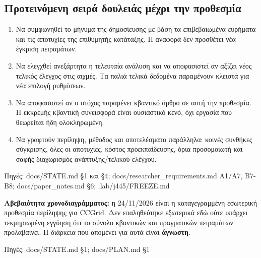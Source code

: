\documentclass[10pt,a4paper]{article}
\newcommand{\src}[1]{\par{\scriptsize\color{gray}Πηγές: {\ttfamily #1}}\par}
\begin{document}
\subsection*{Προτεινόμενη σειρά δουλειάς μέχρι την προθεσμία}
\begin{enumerate}
\item Να συμφωνηθεί το μήνυμα της δημοσίευσης με βάση τα επιβεβαιωμένα ευρήματα και τις αποτυχίες της επιθυμητής κατάταξης. Η αναφορά δεν προσθέτει νέα έγκριση πειραμάτων.
\item Να ελεγχθεί ανεξάρτητα η τελευταία ανάλυση και να αποφασιστεί αν αξίζει νέος τελικός έλεγχος στις αιχμές. Τα παλιά τελικά δεδομένα παραμένουν κλειστά για νέα επιλογή ρυθμίσεων.
\item Να αποφασιστεί αν ο στόχος παραμένει κβαντικό άρθρο σε αυτή την προθεσμία. Η εκκρεμής κβαντική συνεισφορά είναι ουσιαστικό κενό, όχι εργασία που θεωρείται ήδη ολοκληρωμένη.
\item Να γραφτούν περίληψη, μέθοδος και αποτελέσματα παράλληλα: κοινές συνθήκες σύγκρισης, όλες οι αποτυχίες, κόστος προεκπαίδευσης, όρια προσομοιωτή και σαφής διαχωρισμός ανάπτυξης/τελικού ελέγχου.
\end{enumerate}
\src{docs/\allowbreak STATE.md §1 και §4; docs/\allowbreak researcher\_requirements.md A1/\allowbreak A7, B7-\allowbreak B8; docs/\allowbreak paper\_notes.md §6; .lab/\allowbreak j445/\allowbreak FREEZE.md}
\textbf{Αβεβαιότητα χρονοδιαγράμματος:} η 24/11/2026 είναι η καταγεγραμμένη εσωτερική προθεσμία περίληψης για CCGrid. Δεν επαληθεύτηκε εξωτερικά εδώ ούτε υπάρχει τεκμηριωμένη εγγύηση ότι το σύνολο κβαντικών και πραγματικών πειραμάτων προλαβαίνει. Η διάρκεια που απομένει για αυτά είναι \textbf{άγνωστη}.
\src{docs/\allowbreak STATE.md §1; docs/\allowbreak PLAN.md §1}
\end{document}
